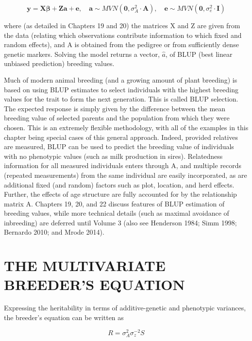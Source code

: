 \documentclass{article}
\begin{document}
\begin{equation}
\mathbf{y}=\mathbf{X}\boldsymbol{\beta}+\mathbf{Z}\mathbf{a}+\mathbf{e},\quad\mathbf{a}\sim MVN(\mathbf{0},\sigma_{A}^{2}\cdot\mathbf{A}),\quad\mathbf{e}\sim MVN(\mathbf{0},\sigma_{e}^{2}\cdot\mathbf{I})
\end{equation}

where (as detailed in Chapters 19 and 20) the matrices X and Z are given from the data (relating which observations contribute information to which fixed and random effects), and A is obtained from the pedigree or from sufficiently dense genetic markers. Solving the model returns a vector,  $ \hat{a} $, of BLUP (best linear unbiased prediction) breeding values.

Much of modern animal breeding (and a growing amount of plant breeding) is based on using BLUP estimates to select individuals with the highest breeding values for the trait to form the next generation. This is called BLUP selection. The expected response is simply given by the difference between the mean breeding value of selected parents and the population from which they were chosen. This is an extremely flexible methodology, with all of the examples in this chapter being special cases of this general approach. Indeed, provided relatives are measured, BLUP can be used to predict the breeding value of individuals with no phenotypic values (such as milk production in sires). Relatedness information for all measured individuals enters through A, and multiple records (repeated measurements) from the same individual are easily incorporated, as are additional fixed (and random) factors such as plot, location, and herd effects. Further, the effects of age structure are fully accounted for by the relationship matrix A. Chapters 19, 20, and 22 discuss features of BLUP estimation of breeding values, while more technical details (such as maximal avoidance of inbreeding) are deferred until Volume 3 (also see Henderson 1984; Simm 1998; Bernardo 2010; and Mrode 2014).

\section{THE MULTIVARIATE BREEDER'S EQUATION}
Expressing the heritability in terms of additive-genetic and phenotypic variances, the breeder’s equation can be written as

\begin{equation}
R=\sigma_{A}^{2}\sigma_{z}^{-2}S
\tag{13.23a}
\label{eq:13_23a}
\end{equation}
\end{document}
